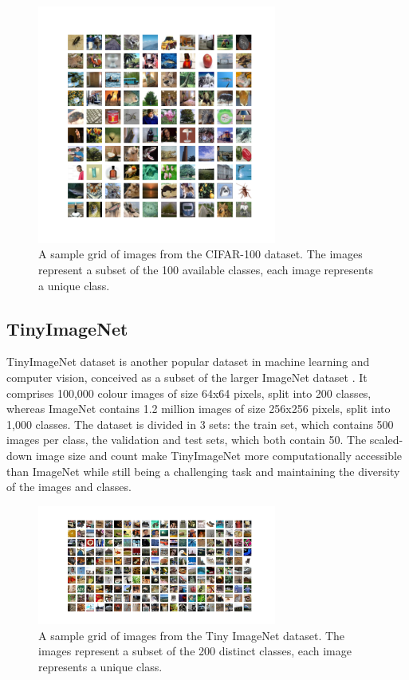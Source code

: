 \begin{figure}[ht!]
  \centering
  \includegraphics[width=0.7\textwidth]{chapter_dlo/assets/cifar-100_example.png}
  \caption{A sample grid of images from the CIFAR-100 dataset. The images
    represent a subset of the 100 available classes, each image represents
    a unique class.}
  \label{fig:intro:cifar100_examples}
\end{figure}


\subsection{TinyImageNet}

TinyImageNet dataset is another popular dataset in machine learning and computer
vision, conceived as a subset of the larger ImageNet dataset
\cite{DBLP:journals/ijcv/RussakovskyDSKS15}. It comprises 100,000 colour images
of size 64x64 pixels, split into 200 classes, whereas ImageNet contains 1.2
million images of size 256x256 pixels, split into 1,000 classes. The dataset is
divided in 3 sets: the train set, which contains 500 images per class, the
validation and test sets, which both contain 50. The scaled-down image size and
count make TinyImageNet more computationally accessible than ImageNet while
still being a challenging task and maintaining the diversity of the images and
classes.\\


\begin{figure}[ht!]
  \centering
  \includegraphics[width=0.7\textwidth]{chapter_dlo/assets/tinyimagenet_example.png}
  \caption{A sample grid of images from the Tiny ImageNet dataset. The images
    represent a subset of the 200 distinct classes, each image represents a
    unique class.}
  \label{fig:intro:tinyimagenet_examples}
\end{figure}

